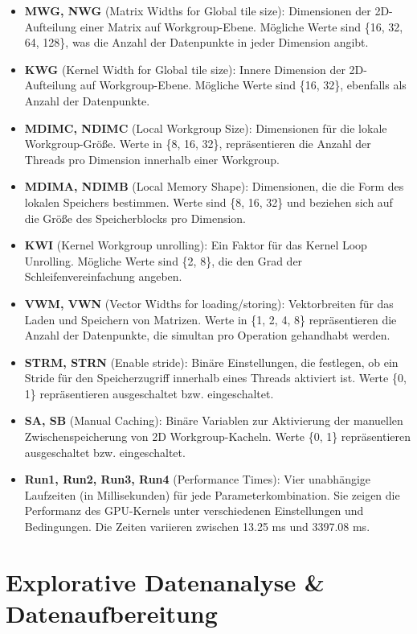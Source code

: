 \begin{itemize}
    \item \textbf{MWG, NWG} (Matrix Widths for Global tile size): Dimensionen der 2D-Aufteilung einer Matrix auf Workgroup-Ebene. Mögliche Werte sind \{16, 32, 64, 128\}, was die Anzahl der Datenpunkte in jeder Dimension angibt.
    \item \textbf{KWG} (Kernel Width for Global tile size): Innere Dimension der 2D-Aufteilung auf Workgroup-Ebene. Mögliche Werte sind \{16, 32\}, ebenfalls als Anzahl der Datenpunkte.
    \item \textbf{MDIMC, NDIMC} (Local Workgroup Size): Dimensionen für die lokale Workgroup-Größe. Werte in \{8, 16, 32\}, repräsentieren die Anzahl der Threads pro Dimension innerhalb einer Workgroup.
    \item \textbf{MDIMA, NDIMB} (Local Memory Shape): Dimensionen, die die Form des lokalen Speichers bestimmen. Werte sind \{8, 16, 32\} und beziehen sich auf die Größe des Speicherblocks pro Dimension.
    \item \textbf{KWI} (Kernel Workgroup unrolling): Ein Faktor für das Kernel Loop Unrolling. Mögliche Werte sind \{2, 8\}, die den Grad der Schleifenvereinfachung angeben.
    \item \textbf{VWM, VWN} (Vector Widths for loading/storing): Vektorbreiten für das Laden und Speichern von Matrizen. Werte in \{1, 2, 4, 8\} repräsentieren die Anzahl der Datenpunkte, die simultan pro Operation gehandhabt werden.
    \item \textbf{STRM, STRN} (Enable stride): Binäre Einstellungen, die festlegen, ob ein Stride für den Speicherzugriff innerhalb eines Threads aktiviert ist. Werte \{0, 1\} repräsentieren ausgeschaltet bzw. eingeschaltet.
    \item \textbf{SA, SB} (Manual Caching): Binäre Variablen zur Aktivierung der manuellen Zwischenspeicherung von 2D Workgroup-Kacheln. Werte \{0, 1\} repräsentieren ausgeschaltet bzw. eingeschaltet.
    \item \textbf{Run1, Run2, Run3, Run4} (Performance Times): Vier unabhängige Laufzeiten (in Millisekunden) für jede Parameterkombination. Sie zeigen die Performanz des GPU-Kernels unter verschiedenen Einstellungen und Bedingungen. Die Zeiten variieren zwischen 13.25 ms und 3397.08 ms.
\end{itemize}

\section{Explorative Datenanalyse \& Datenaufbereitung}

